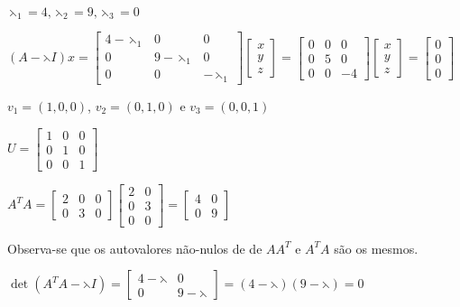 \documentclass[leqno]{article}
\numberwithin{equation}{section}
\begin{document}
\begin{enumerate}
\begin{sol}
		$ \leftthreetimes_1 = 4, \leftthreetimes_2 = 9, \leftthreetimes_3 = 0$
		
		$(A - \leftthreetimes I)x = \begin{bmatrix}
			4 - \leftthreetimes_1 & 0 & 0\\
			0 & 9 - \leftthreetimes_1 & 0\\
			0 & 0 & - \leftthreetimes_1
		\end{bmatrix}\begin{bmatrix}
			x\\
			y\\
			z
		\end{bmatrix} = \begin{bmatrix}
			0 & 0 & 0\\
			0 & 5 & 0\\
			0 & 0 & -4
		\end{bmatrix}\begin{bmatrix}
			x\\
			y\\
			z
		\end{bmatrix} = \begin{bmatrix}
			0\\
			0\\
			0
		\end{bmatrix}$
	
		$v_1 = (1, 0, 0)$, $v_2 = (0, 1, 0)$ e $v_3 = (0, 0, 1)$
		
		$U = \begin{bmatrix}
			1 & 0 & 0\\
			0 & 1 & 0\\
			0 & 0 & 1
		\end{bmatrix}$
	
		$A^TA = \begin{bmatrix}
			2 & 0 & 0\\
			0 & 3 & 0
		\end{bmatrix}\begin{bmatrix}
			2 & 0 \\
			0 & 3 \\
			0 & 0
		\end{bmatrix} = \begin{bmatrix}
			4 & 0 \\
			0 & 9 
		\end{bmatrix}$
	
		Observa-se que os autovalores não-nulos de de $AA^T$ e $A^TA$ são os mesmos.
	
		$\det(A^TA - \leftthreetimes I) = \begin{bmatrix}
			4 - \leftthreetimes & 0 \\
			0 & 9 - \leftthreetimes
		\end{bmatrix} = (4 - \leftthreetimes)(9 - \leftthreetimes) = 0$
	

\end{sol}
\end{enumerate}
\end{document}
